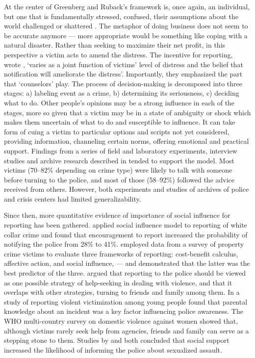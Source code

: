 \documentclass[]{interact}
\theoremstyle{plain}%
\theoremstyle{definition}
\theoremstyle{remark}
\newcommand\citep{\parencite}
\newcommand\citet{\textcite}
\begin{document}
	At the center of Greenberg and Ruback's framework is, once again, an individual, but one that is fundamentally stressed, confused, their assumptions about the world challenged or shattered \citep{janoff1986aftermath}. The metaphor of doing business does not seem to be accurate anymore --- more appropriate would be something like coping with a natural disaster. Rather than seeking to maximize their net profit, in this perspective a victim acts to amend the distress. The incentive for reporting, wrote \citet{greenberg1992after}, `varies as a joint function of victims' level of distress and the belief that notification will ameliorate the distress'. Importantly, they emphasized the part that `counselors' play. The process of decision-making is decomposed into three stages: a) labeling event as a crime, b) determining its seriousness, c) deciding what to do. Other people's opinions may be a strong influence in each of the stages, more so given that a victim may be in a state of ambiguity or shock which makes them uncertain of what to do and susceptible to influence. It can take form of cuing a victim to particular options and scripts not yet considered, providing information, channeling certain norms, offering emotional and practical support. Findings from a series of field and laboratory experiments, interview studies and archive research described in \citet{greenberg1992after} tended to support the model. Most victims (70--82\% depending on crime type) were likely to talk with someone before turning to the police, and most of those (58--92\%) followed the advice received from others. However, both experiments and studies of archives of police and crisis centers had limited generalizability. 
	
	Since then, more quantitative evidence of importance of social influence for reporting has been gathered. \citet{mason1996effect} applied social influence model to reporting of white collar crime and found that encouragement to report increased the probability of notifying the police from 28\% to 41\%. \citet{greenberg2004property} employed data from a survey of property crime victims to evaluate three frameworks of reporting: cost-benefit calculus, affective action, and social influence, --- and demonstrated that the latter was the best predictor of the three. \citet{kaukinen2004help} argued that reporting to the police should be viewed as one possible strategy of help-seeking in dealing with violence, and that it overlaps with other strategies, turning to friends and family among them. In a study of reporting violent victimization among young people \citet{zaykowski2015reconceptualizing} found that parental knowledge about an incident was a key factor influencing police awareness. The WHO multi-country survey on domestic violence against women \citep{garcia2005multi} showed that, although victims rarely seek help from agencies, friends and family can serve as a stepping stone to them. Studies by \citet{paul2014does} and \citet{baert2024factors} both concluded that social support increased the likelihood of informing the police about sexualized assault. 
	
\end{document}
